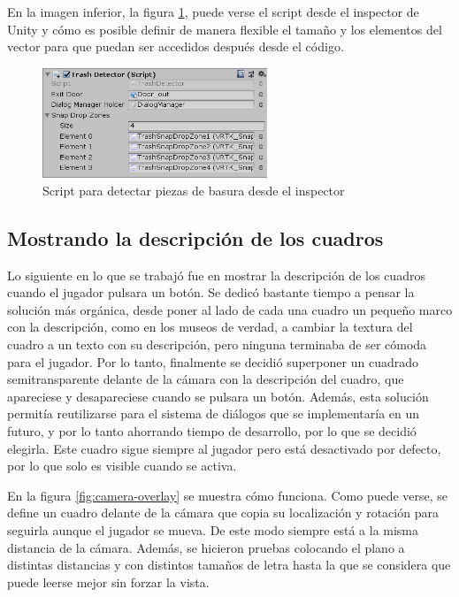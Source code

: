 En la imagen inferior, la figura \ref{fig:trash-detector}, puede verse el script desde el inspector de Unity y cómo es posible definir de manera flexible el tamaño y los elementos del vector para que puedan ser accedidos después desde el código. 

\begin{figure}[!h]
\begin{center}
\includegraphics[width=0.6\textwidth]{imagenes/7/trash-detector.png}
\caption{Script para detectar piezas de basura desde el inspector}
\label{fig:trash-detector}
\end{center}
\vspace{-0.25cm}
\end{figure}

\subsection{Mostrando la descripción de los cuadros}

Lo siguiente en lo que se trabajó fue en mostrar la descripción de los cuadros cuando el jugador pulsara un botón. Se dedicó bastante tiempo a pensar la solución más orgánica, desde poner al lado de cada una cuadro un pequeño marco con la descripción, como en los museos de verdad, a cambiar la textura del cuadro a un texto con su descripción, pero ninguna terminaba de ser cómoda para el jugador. Por lo tanto, finalmente se decidió superponer un cuadrado semitransparente delante de la cámara con la descripción del cuadro, que apareciese y desapareciese cuando se pulsara un botón. Además, esta solución permitía reutilizarse para el sistema de diálogos que se implementaría en un futuro, y por lo tanto ahorrando tiempo de desarrollo, por lo que se decidió elegirla. Este cuadro sigue siempre al jugador pero está desactivado por defecto, por lo que solo es visible cuando se activa.

En la figura \ref{fig:camera-overlay} se muestra cómo funciona. Como puede verse, se define un cuadro delante de la cámara que copia su localización y rotación para seguirla aunque el jugador se mueva. De este modo siempre está a la misma distancia de la cámara. Además, se hicieron pruebas colocando el plano a distintas distancias y con distintos tamaños de letra hasta la que se considera que puede leerse mejor sin forzar la vista.

